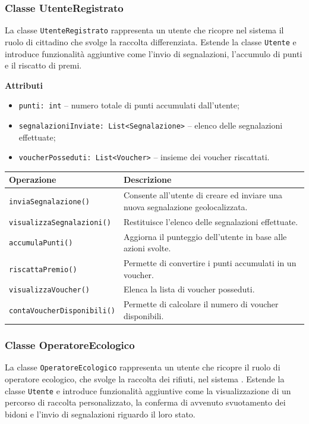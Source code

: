 \documentclass[12pt,a4paper]{article}
\begin{document}
\subsubsection{Classe UtenteRegistrato}
La classe \texttt{UtenteRegistrato} rappresenta un utente che ricopre nel sistema il ruolo di cittadino che svolge la raccolta differenziata. 
Estende la classe \texttt{Utente} e introduce funzionalità aggiuntive come l'invio di segnalazioni, l'accumulo di punti e il riscatto di premi.

\textbf{Attributi}
\begin{itemize}
    \item \texttt{punti: int} -- numero totale di punti accumulati dall'utente;
    \item \texttt{segnalazioniInviate: List<\texttt{Segnalazione}>} -- elenco delle segnalazioni effettuate;
    \item \texttt{voucherPosseduti: List<\texttt{Voucher}>} -- insieme dei voucher riscattati.
\end{itemize}

\begin{table}[H]
\centering
\begin{tabularx}{\textwidth}{@{}lX@{}}
\toprule
\textbf{Operazione} & \textbf{Descrizione} \\ \midrule
\texttt{inviaSegnalazione()} & Consente all'utente di creare ed inviare una nuova segnalazione geolocalizzata. \\
\texttt{visualizzaSegnalazioni()} & Restituisce l'elenco delle segnalazioni effettuate. \\
\texttt{accumulaPunti()} & Aggiorna il punteggio dell'utente in base alle azioni svolte. \\
\texttt{riscattaPremio()} & Permette di convertire i punti accumulati in un voucher. \\
\texttt{visualizzaVoucher()} & Elenca la lista di voucher posseduti. \\
\texttt{contaVoucherDisponibili()} & Permette di calcolare il numero di voucher disponibili. \\
\bottomrule
\end{tabularx}
\end{table}

\subsubsection{Classe OperatoreEcologico}
La classe \texttt{OperatoreEcologico} rappresenta un utente che ricopre il ruolo di operatore ecologico, che svolge la raccolta dei rifiuti, nel sistema . 
Estende la classe \texttt{Utente} e introduce funzionalità aggiuntive come la visualizzazione di un percorso di raccolta personalizzato, 
la conferma di avvenuto svuotamento dei bidoni e l'invio di segnalazioni riguardo il loro stato.
\end{document}
